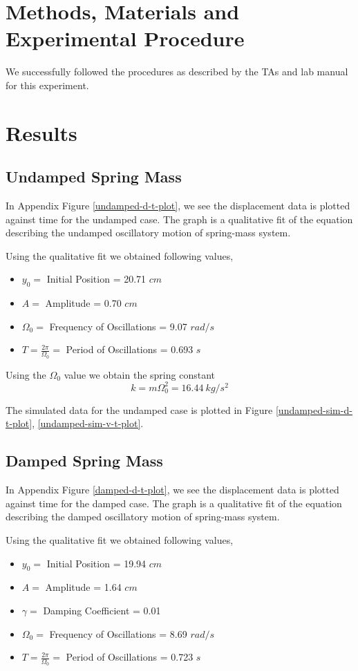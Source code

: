 \documentclass[letterpaper,12pt]{article}
\begin{document}
\section{Methods, Materials and Experimental Procedure}

We successfully followed the procedures as described by the TAs and lab manual \cite{lab-manual-ex4} for this experiment.

\section{Results}
\subsection{Undamped Spring Mass}

In Appendix Figure \ref{undamped-d-t-plot}, we see the displacement data is 
plotted against time for the undamped case. The graph is a qualitative fit 
of the equation describing the undamped oscillatory motion of spring-mass system.

Using the qualitative fit we obtained following values,
\begin{itemize}
  \item[] $y_0=$ Initial Position = 20.71 $cm$
  \item[] $A=$ Amplitude = 0.70 $cm$
  \item[] $\Omega_0=$ Frequency of Oscillations = 9.07 $rad/s$
  \item[] $T = \frac{2\pi}{\Omega_0} =$ Period of Oscillations = 0.693 $s$
\end{itemize}

Using the $\Omega_0$ value we obtain the spring constant $$k = m \Omega^2_0 = 16.44\ kg/s^2$$

The simulated data for the undamped case is plotted in Figure \ref{undamped-sim-d-t-plot}, \ref{undamped-sim-v-t-plot}. 

\subsection{Damped Spring Mass}

In Appendix Figure \ref{damped-d-t-plot}, we see the displacement data is 
plotted against time for the damped case. The graph is a qualitative fit 
of the equation describing the damped oscillatory motion of spring-mass system.

Using the qualitative fit we obtained following values,
\begin{itemize}
  \item[] $y_0=$ Initial Position = 19.94 $cm$
  \item[] $A=$ Amplitude = 1.64 $cm$
  \item[] $\gamma=$ Damping Coefficient = 0.01
  \item[] $\Omega_0=$ Frequency of Oscillations = 8.69 $rad/s$
  \item[] $T = \frac{2\pi}{\Omega_0} =$ Period of Oscillations = 0.723 $s$ 
\end{itemize}
\end{document}
